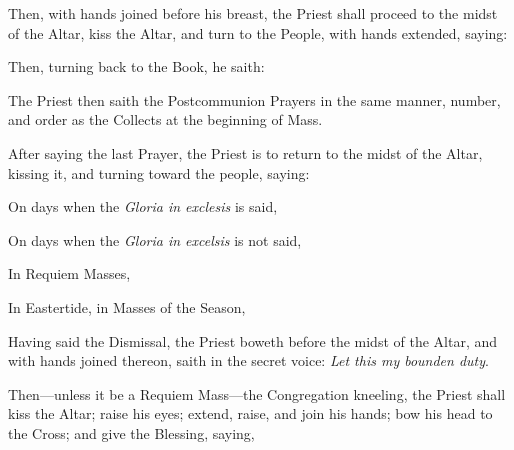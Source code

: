\begin{rubric}
    Then, with hands joined before his breast, the Priest shall proceed to the midst of the Altar, kiss the Altar, and turn to the People, with hands extended, saying:
\end{rubric}
\begin{rubric}
    Then, turning back to the Book, he saith:
\end{rubric}
\begin{rubric}
The Priest then saith the Postcommunion Prayers in the same manner, number, and order as the Collects at the beginning of Mass.
\end{rubric}
\begin{rubric}
    After saying the last Prayer, the Priest is to return to the midst of the Altar, kissing it, and turning toward the people, saying:
\end{rubric}
    \begin{rubric}
    	{On days when the \emph{Gloria in exclesis} is said,}
    \end{rubric}
    \begin{rubric}
    	{On days when the \emph{Gloria in excelsis} is not said,}
    \end{rubric}
\begin{rubric}
In Requiem Masses,
\end{rubric}
\begin{rubric}
    In Eastertide, in Masses of the Season,
\end{rubric}
\begin{rubric}
    Having said the Dismissal, the Priest boweth before the midst of the Altar, and with hands joined thereon, saith in the secret voice: \emph{Let this my bounden duty}.
\end{rubric}
\begin{rubric}
    Then---unless it be a Requiem Mass---the Congregation kneeling, the Priest shall kiss the Altar; raise his eyes; extend, raise, and join his hands; bow his head to the Cross; and give the Blessing, saying,
\end{rubric}
